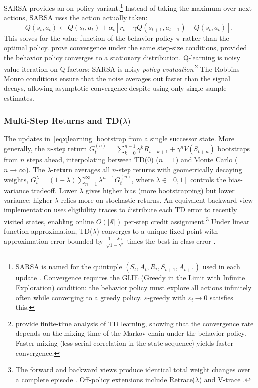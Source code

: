 SARSA provides an on-policy variant.\footnote{SARSA is named for the quintuple $(S_t, A_t, R_t, S_{t+1}, A_{t+1})$ used in each update \citep{rummery1994}. Convergence requires the GLIE (Greedy in the Limit with Infinite Exploration) condition: the behavior policy must explore all actions infinitely often while converging to a greedy policy. $\varepsilon$-greedy with $\varepsilon_t \to 0$ satisfies this.} Instead of taking the maximum over next actions, SARSA uses the action actually taken:
\begin{equation}
Q(s_t, a_t) \leftarrow Q(s_t, a_t) + \alpha_t \left[ r_t + \gamma Q(s_{t+1}, a_{t+1}) - Q(s_t, a_t) \right].
\end{equation}
This solves for the value function of the behavior policy $\pi$ rather than the optimal policy. \citet{singh2000} prove convergence under the same step-size conditions, provided the behavior policy converges to a stationary distribution. Q-learning is noisy value iteration on Q-factors; SARSA is noisy \emph{policy evaluation}.\footnote{\citet{bhandari2021finite} provide finite-time analysis of TD learning, showing that the convergence rate depends on the mixing time of the Markov chain under the behavior policy. Faster mixing (less serial correlation in the state sequence) yields faster convergence.} The Robbins-Monro conditions ensure that the noise averages out faster than the signal decays, allowing asymptotic convergence despite using only single-sample estimates.

\subsubsection{Multi-Step Returns and TD($\lambda$)}
\label{sec:td_lambda}

The updates in~\eqref{eq:qlearning} bootstrap from a single successor state. More generally, the $n$-step return $G_t^{(n)} = \sum_{k=0}^{n-1} \gamma^k R_{t+k+1} + \gamma^n V(S_{t+n})$ bootstraps from $n$ steps ahead, interpolating between TD(0) ($n=1$) and Monte Carlo ($n \to \infty$). The $\lambda$-return \citep{sutton1988} averages all $n$-step returns with geometrically decaying weights, $G_t^\lambda = (1-\lambda) \sum_{n=1}^{\infty} \lambda^{n-1} G_t^{(n)}$, where $\lambda \in [0,1]$ controls the bias-variance tradeoff. Lower $\lambda$ gives higher bias (more bootstrapping) but lower variance; higher $\lambda$ relies more on stochastic returns. An equivalent backward-view implementation uses eligibility traces to distribute each TD error to recently visited states, enabling online $O(|\mathcal{S}|)$ per-step credit assignment.\footnote{The forward and backward views produce identical total weight changes over a complete episode \citep{sutton1988}. Off-policy extensions include Retrace($\lambda$) \citep{munos2016retrace} and V-trace \citep{espeholt2018impala}.} Under linear function approximation, TD($\lambda$) converges to a unique fixed point with approximation error bounded by $\frac{1-\lambda\gamma}{\sqrt{1-\gamma^2}}$ times the best-in-class error \citep{tsitsiklis1997}.

